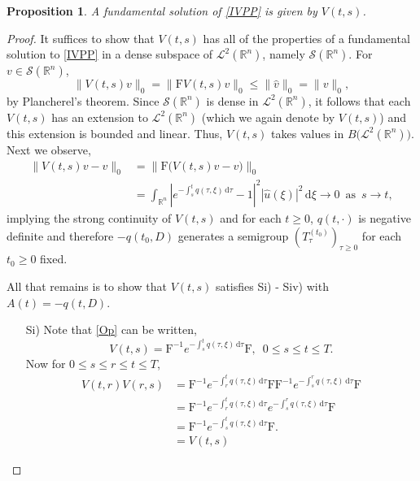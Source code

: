 \documentclass[a4paper, 12pt]{report}
\newtheorem{proposition}[theorem]{Proposition}
\theoremstyle{remark}
\theoremstyle{definition}
\begin{document}
\begin{proposition}\label{TDSFSP2}
A fundamental solution of \eqref{IVPP} is given by $V(t, s)$.
\end{proposition}
\begin{proof}
It suffices to show that $V(t, s)$ has all of the properties of a fundamental solution to \eqref{IVPP} in a dense subspace of $\mathcal{L}^2(\mathbb{R}^n)$, namely $\mathcal{S}(\mathbb{R}^n)$.  For $v \in \mathcal{S}(\mathbb{R}^n)$,
$$
\big\|V(t, s)v\big\|_0 = \big\|\mathrm{F}V(t, s)v\big\|_0 \le \|\hat{v}\|_0 = \|v\|_0,
$$
by Plancherel's theorem.  Since $\mathcal{S}(\mathbb{R}^n)$ is dense in $\mathcal{L}^2(\mathbb{R}^n)$, it follows that each $V(t, s)$ has an extension to $\mathcal{L}^2(\mathbb{R}^n)$ (which we again denote by $V(t, s)$) and this extension is bounded and linear.  Thus, $V(t, s)$ takes values in $B\big(\mathcal{L}^2(\mathbb{R}^n)\big)$.  Next we observe,
\begin{align}
\|V(t, s)v - v\|_0 & = \big\|\mathrm{F}\big(V(t, s)v - v\big)\big\|_0\nonumber\\
& = \int_{\mathbb{R}^n}\left|e^{-\int_s^tq(\tau, \xi)\,\mathrm{d}\tau} - 1\right|^2|\hat{u}(\xi)|^2\,\mathrm{d}\xi \to 0 \,\,\, \text{as} \,\,\, s \to t,\nonumber
\end{align}
implying the strong continuity of $V(t, s)$ and for each $t \ge 0$, $q(t, \cdot)$ is negative definite and therefore $-q(t_0, D)$ generates a semigroup $(T_\tau^{(t_0)})_{\tau \ge 0}$ for each $t_0 \ge 0$ fixed.

All that remains is to show that $V(t, s)$ satisfies Si) - Siv) with $A(t) = -q(t, D)$.
\begin{itemize}

\item[Si)] Note that \eqref{Op} can be written,
$$
V(t, s) = \mathrm{F}^{-1}e^{-\int_s^tq(\tau, \xi)\,\mathrm{d}\tau}\mathrm{F}, \,\,\, 0 \le s \le t \le T.
$$
Now for $0 \le s \le r \le t \le T$,
\begin{align}
V(t, r)V(r, s) & = \mathrm{F}^{-1}e^{-\int_r^tq(\tau, \xi)\,\mathrm{d}\tau}\mathrm{F}\mathrm{F}^{-1}e^{-\int_s^rq(\tau, \xi)\,\mathrm{d}\tau}\mathrm{F}\nonumber\\
& = \mathrm{F}^{-1}e^{-\int_r^tq(\tau, \xi)\,\mathrm{d}\tau}e^{-\int_s^rq(\tau, \xi)\,\mathrm{d}\tau}\mathrm{F}\nonumber\\
& = \mathrm{F}^{-1}e^{-\int_s^tq(\tau, \xi)\,\mathrm{d}\tau}\mathrm{F}.\nonumber\\
& = V(t, s)\nonumber
\end{align}


\end{itemize}
\end{proof}
\end{document}
